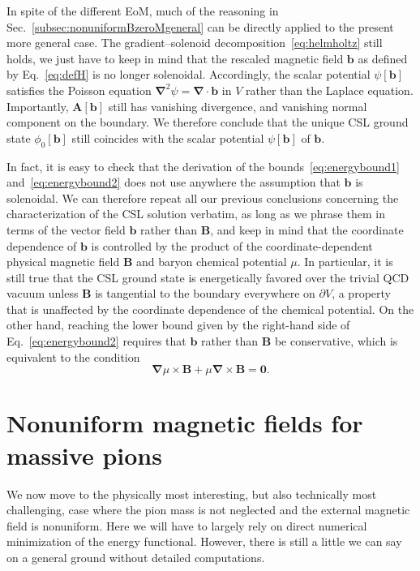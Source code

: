 \documentclass[pdflatex,iicol,sn-mathphys-num]{sn-jnl}
\let\m=\mu
\let\p=\phi
\let\de=\partial
\newcommand{\vek}[1]{\bm{#1}}%
\newcommand{\grad}{\vek\nabla}%
\newcommand{\divg}{\grad\cdot}%
\newcommand{\bmag}{b}%
\begin{document}
In spite of the different EoM, much of the reasoning in Sec.~\ref{subsec:nonuniformBzeroMgeneral} can be directly applied to the present more general case. The gradient--solenoid decomposition~\eqref{eq:helmholtz} still holds, we just have to keep in mind that the rescaled magnetic field $\vek\bmag$ as defined by Eq.~\eqref{eq:defH} is no longer solenoidal. Accordingly, the scalar potential $\psi[\vek\bmag]$ satisfies the Poisson equation $\grad^2\psi=\divg\vek\bmag$ in $V$ rather than the Laplace equation. Importantly, $\vek A[\vek\bmag]$ still has vanishing divergence, and vanishing normal component on the boundary. We therefore conclude that the unique CSL ground state $\p_0[\vek\bmag]$  still coincides with the scalar potential $\psi[\vek\bmag]$ of $\vek\bmag$.

In fact, it is easy to check that the derivation of the bounds~\eqref{eq:energybound1} and~\eqref{eq:energybound2} does not use anywhere the assumption that $\vek\bmag$ is solenoidal. We can therefore repeat all our previous conclusions concerning the characterization of the CSL solution verbatim, as long as we phrase them in terms of the vector field $\vek\bmag$ rather than $\vek B$, and keep in mind that the coordinate dependence of $\vek\bmag$ is controlled by the product of the coordinate-dependent physical magnetic field $\vek B$ and baryon chemical potential $\m$. In particular, it is still true that the CSL ground state is energetically favored over the trivial QCD vacuum unless $\vek B$ is tangential to the boundary everywhere on $\de V$, a property that is unaffected by the coordinate dependence of the chemical potential. On the other hand, reaching the lower bound given by the right-hand side of Eq.~\eqref{eq:energybound2} requires that $\vek\bmag$ rather than $\vek B$ be conservative, which is equivalent to the condition
\begin{equation}
\grad\m\times\vek B+\m\grad\times\vek B=\vek0.
\end{equation}


\section{Nonuniform magnetic fields for massive pions}
\label{sec:nonuniformBnonzeroM}

We now move to the physically most interesting, but also technically most challenging, case where the pion mass is not neglected and the external magnetic field is nonuniform. Here we will have to largely rely on direct numerical minimization of the energy functional. However, there is still a little we can say on a general ground without detailed computations.
\end{document}
